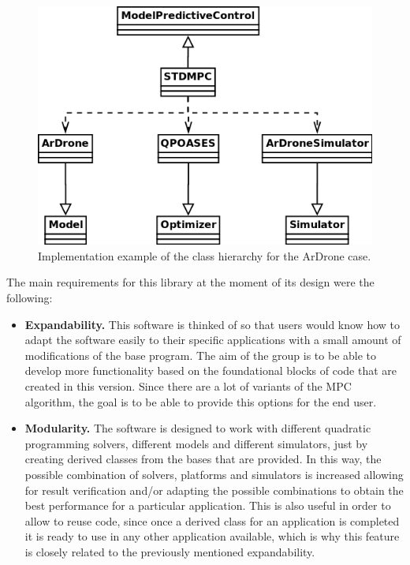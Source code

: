 \begin{figure}[h!]
\centering
\includegraphics[scale=0.5]{Images/Chapter4/Class_diagram_implementation.png}
\caption{Implementation example of the class hierarchy for the ArDrone case.}
\label{fig:implementation_class_diagram}
\end{figure}

The main requirements for this library at the moment of its design were the following:

\begin{itemize}

\item \textbf{Expandability.} This software is thinked of so that users would know how to adapt the software easily to their specific applications with a small amount of modifications of the base program. The aim of the group is to be able to develop more functionality based on the foundational blocks of code that are created in this version. Since there are a lot of variants of the MPC algorithm, the goal is to be able to provide this options for the end user. 

\item \textbf{Modularity.} The software is designed to work with different quadratic programming solvers, different models and different simulators, just by creating derived classes from the bases that are provided. In this way, the possible combination of solvers, platforms and simulators is increased allowing for result verification and/or adapting the possible combinations to obtain the best performance for a particular application. This is also useful in order to allow to reuse code, since once a derived class for an application is completed it is ready to use in any other application available, which is why this feature is closely related to the previously mentioned expandability.

\end{itemize}

